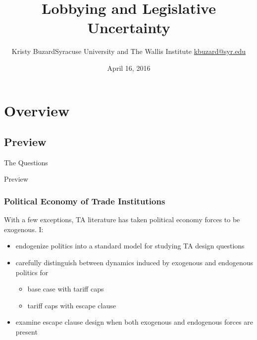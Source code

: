 \documentclass[handout]{beamer}
\title[Lobbying and Legislative Uncertainty\hspace{2.95in}\insertframenumber/\inserttotalframenumber]{Lobbying and Legislative Uncertainty}
\author[Kristy Buzard]{\texorpdfstring{Kristy Buzard\newline Syracuse University and The Wallis Institute  \newline\url{kbuzard@syr.edu}}{Kristy Buzard}}
\date{April 16, 2016}
\begin{document}
\maketitle




\section{Overview}
\subsection{Preview}
\begin{frame}{The Questions}

\pause
{}

\end{frame}


\begin{frame}{Preview}
\frametitle{Political Economy of Trade Institutions}
\pause
With a few exceptions, TA literature has taken political economy forces to be exogenous. I:
\pause
\begin{itemize}[<+->]
	\item endogenize politics into a standard model for studying TA design questions
	\item carefully distinguish between dynamics induced by exogenous and endogenous politics for
		\begin{itemize}[<+->]
			\item base case with tariff caps
			\item tariff caps with escape clause
		\end{itemize}
	\item examine escape clause design when both exogenous and endogenous forces are present
\end{itemize}
\end{frame}
\end{document}
